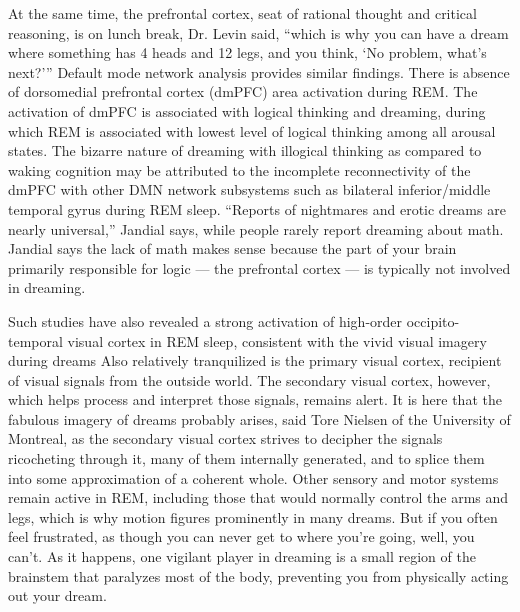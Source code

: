 At the same time, the prefrontal cortex, seat of rational thought and critical
reasoning, is on lunch break, Dr. Levin said, “which is why you can have a dream where something has 4 heads and 12 legs,
and you think, ‘No problem, what’s next?’”
Default mode network analysis provides similar findings. There is absence of dorsomedial prefrontal cortex (dmPFC)
area activation during REM. The activation of dmPFC is associated with logical thinking and dreaming,
during which REM is associated with lowest level of logical thinking among all arousal states.
The bizarre nature of dreaming with illogical thinking as compared to waking cognition may be attributed to the
incomplete reconnectivity of the dmPFC with other DMN network subsystems such as bilateral inferior/middle temporal
gyrus during REM sleep.
“Reports of nightmares and erotic dreams are nearly universal,” Jandial says, while people rarely report dreaming
about math. Jandial says the lack of math makes sense because the part of your brain primarily responsible for logic —
the prefrontal cortex — is typically not involved in dreaming.

Such studies have also revealed a strong activation of high-order occipito-temporal visual cortex in REM sleep,
consistent with the vivid visual imagery during dreams
Also relatively tranquilized is the primary visual cortex, recipient of
visual signals from the outside world. The secondary visual cortex, however, which helps process and interpret those
signals, remains alert. It is here that the fabulous imagery of dreams probably arises, said Tore Nielsen of the
University of Montreal, as the secondary visual cortex strives to decipher the signals ricocheting through it,
many of them internally generated, and to splice them into some approximation of a coherent whole. Other sensory and
motor systems remain active in REM, including those that would normally control the arms and legs, which is why motion
figures prominently in many dreams. But if you often feel frustrated, as though you can never get to where you’re going,
well, you can’t. As it happens, one vigilant player in dreaming is a small region of the brainstem that paralyzes most
of the body, preventing you from physically acting out your dream.

